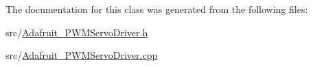 The documentation for this class was generated from the following files\+:\begin{DoxyCompactItemize}
\item 
src/\hyperlink{Adafruit__PWMServoDriver_8h}{Adafruit\+\_\+\+P\+W\+M\+Servo\+Driver.\+h}\item 
src/\hyperlink{Adafruit__PWMServoDriver_8cpp}{Adafruit\+\_\+\+P\+W\+M\+Servo\+Driver.\+cpp}\end{DoxyCompactItemize}
